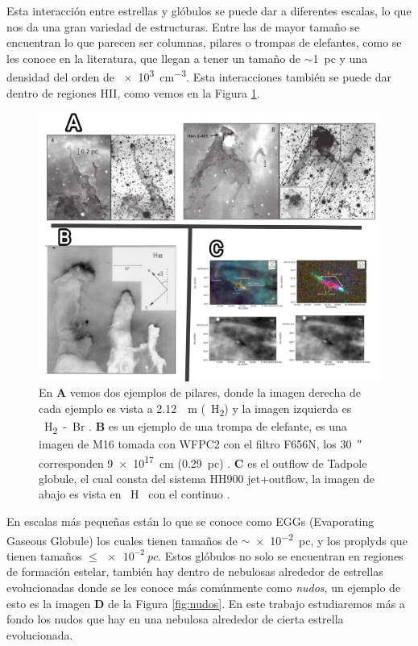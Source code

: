 \documentclass{book}
\begin{document}
Esta interacción entre estrellas y glóbulos se puede dar a diferentes escalas, lo que nos da una gran variedad de estructuras. Entre las de mayor tamaño se encuentran lo que parecen ser columnas, pilares o trompas de elefantes, como se les conoce en la literatura, que llegan a tener un tamaño de $\sim$\SI{1}{pc} y una densidad del orden de \SI{e3}{cm^{-3}}. Esta interacciones también se puede dar dentro de regiones HII, como vemos en la Figura \ref{fig:Pillars}.

\begin{figure}[htb]
    \centering
    \includegraphics[width=1 \textwidth]{images Chapter 1/C1_Pillars.jpg}
    \caption{En \textbf{A} vemos dos ejemplos de pilares, donde la imagen derecha de cada ejemplo es vista a \SI{2.12}{\mu m} (\SI{}{H_2}) y la imagen izquierda es \SI{}{H_2-Br_{\gamma}} \citep{Hartigan:2015}. \textbf{B} es un ejemplo de una trompa de elefante, es una imagen de M16 tomada con WFPC2 con el filtro F656N, los \SI{30}{\arcsecond} corresponden \SI{9e17}{cm} (\SI{0.29}{pc}) \citep{JJHester:1996}. \textbf{C} es el outflow de Tadpole globule, el cual consta del sistema HH900 jet+outflow, la imagen de abajo es vista en \SI{}{H\alpha} con el continuo 
    \citep{MeganReiter:2019}. }
    \label{fig:Pillars}
\end{figure}

En escalas más pequeñas están lo que se conoce como EGGs (Evaporating Gaseous Globule) los cuales tienen tamaños de $\sim$\SI{e-2}{pc}, y los proplyds que tienen tamaños $\le\SI{e-2}{pc}$. 
Estos glóbulos no solo se encuentran en regiones de formación estelar, también hay dentro de nebulosas alrededor de estrellas evolucionadas donde se les conoce más comúnmente como \textit{nudos}, un ejemplo de esto es la imagen \textbf{D} de la Figura \ref{fig:nudos}. En este trabajo estudiaremos más a fondo los nudos que hay en una nebulosa alrededor de cierta estrella evolucionada.
\end{document}
